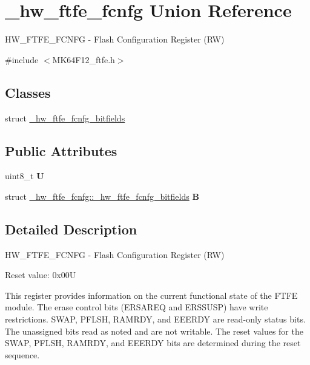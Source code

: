 \hypertarget{union__hw__ftfe__fcnfg}{}\section{\+\_\+hw\+\_\+ftfe\+\_\+fcnfg Union Reference}
\label{union__hw__ftfe__fcnfg}


H\+W\+\_\+\+F\+T\+F\+E\+\_\+\+F\+C\+N\+FG -\/ Flash Configuration Register (RW)  




{\ttfamily \#include $<$M\+K64\+F12\+\_\+ftfe.\+h$>$}

\subsection*{Classes}
\begin{DoxyCompactItemize}
\item 
struct \hyperlink{struct__hw__ftfe__fcnfg_1_1__hw__ftfe__fcnfg__bitfields}{\+\_\+hw\+\_\+ftfe\+\_\+fcnfg\+\_\+bitfields}
\end{DoxyCompactItemize}
\subsection*{Public Attributes}
\begin{DoxyCompactItemize}
\item 
uint8\+\_\+t {\bfseries U}\hypertarget{union__hw__ftfe__fcnfg_a3f604afc9066d6a21b33570f7324337c}{}\label{union__hw__ftfe__fcnfg_a3f604afc9066d6a21b33570f7324337c}

\item 
struct \hyperlink{struct__hw__ftfe__fcnfg_1_1__hw__ftfe__fcnfg__bitfields}{\+\_\+hw\+\_\+ftfe\+\_\+fcnfg\+::\+\_\+hw\+\_\+ftfe\+\_\+fcnfg\+\_\+bitfields} {\bfseries B}\hypertarget{union__hw__ftfe__fcnfg_a9fa46574a88ea6e8f83456f5ee644a2a}{}\label{union__hw__ftfe__fcnfg_a9fa46574a88ea6e8f83456f5ee644a2a}

\end{DoxyCompactItemize}


\subsection{Detailed Description}
H\+W\+\_\+\+F\+T\+F\+E\+\_\+\+F\+C\+N\+FG -\/ Flash Configuration Register (RW) 

Reset value\+: 0x00U

This register provides information on the current functional state of the F\+T\+FE module. The erase control bits (E\+R\+S\+A\+R\+EQ and E\+R\+S\+S\+U\+SP) have write restrictions. S\+W\+AP, P\+F\+L\+SH, R\+A\+M\+R\+DY, and E\+E\+E\+R\+DY are read-\/only status bits. The unassigned bits read as noted and are not writable. The reset values for the S\+W\+AP, P\+F\+L\+SH, R\+A\+M\+R\+DY, and E\+E\+E\+R\+DY bits are determined during the reset sequence. 

